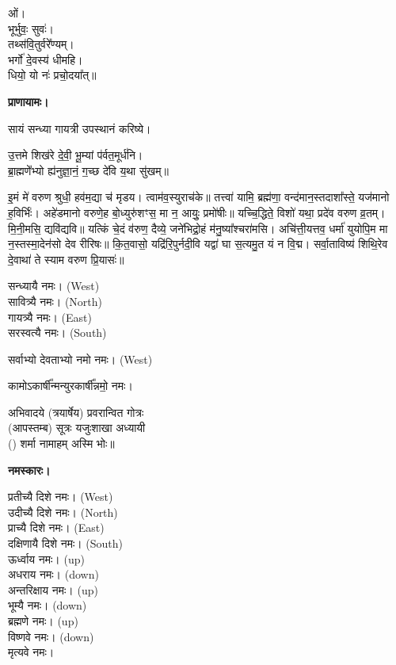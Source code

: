 ओं।\\
भूर्भुवः॒ सुवः॑।\\
तथ्स॑वि॒तुर्वरे᳚ण्यम्।\\
भर्गो॑ दे॒वस्य॑ धीमहि।\\
धियो॒ यो नः॑ प्रचो॒दया᳚त्॥

\textbf{प्राणायामः।}


सायं सन्ध्या गायत्री उपस्थानं करिष्ये।

उ॒त्तमे शिख॑रे दे॒वी॒ भू॒म्यां प॑र्वत॒मूर्ध॑नि।\\
ब्रा॒ह्मणे॑॑भ्यो ह्य॑नुज्ञा॒नं॒ ग॒च्छ दे॑वि य॒था सु॑खम्॥


इ॒मं मे॑ वरुण श्रुधी॒ हव॑म॒द्या च॑ मृडय। त्वाम॑व॒स्युराच॑के॥ तत्त्वा॑ यामि॒ ब्रह्म॑णा॒ वन्द॑मान॒स्तदाशा᳚स्ते॒ यज॑मानो ह॒विर्भिः॑। अहे॑डमानो वरुणे॒ह बो॒ध्युरु॑शꣳस॒ मा न॒ आयुः॒ प्रमो॑षीः॥
यच्चि॒द्धिते॒ विशो॑ यथा॒ प्रदे॑व वरुण व्र॒तम्। मि॒नी॒मसि॒ द्यवि॑द्यवि॥ यत्किं चे॒दं व॑रुण॒ दैव्ये॒ जने॑भिद्रो॒हं म॑नु॒ष्या᳚श्चरा॑मसि। अचि॑त्ती॒यत्तव॒ धर्मा॑ युयोपि॒म मा न॒स्तस्मा॒देन॑सो देव रीरिषः॥ कि॒त॒वासो॒ यद्रि॑रि॒पुर्नदी॒वि यद्वा॑ घा स॒त्यमु॒त यं न वि॒द्म। सर्वा॒ताविष्य॑ शिथि॒रेव दे॒वाथा॑ ते स्याम वरुण प्रि॒यासः॑॥


सन्ध्यायै नमः।  {\scriptsize (West)}\\
सावित्र्यै नमः। {\scriptsize (North)}\\
गायत्र्यै नमः।  {\scriptsize (East)}\\
सरस्वत्यै नमः।  {\scriptsize (South)}

सर्वाभ्यो देवताभ्यो नमो नमः। {\scriptsize (West)}

कामोऽकार्\mbox{}षी᳚न्मन्युरकार्\mbox{}षी᳚न्नमो॒ नमः।

अभिवादये \blank{} (त्रयार्षेय) प्रवरान्वित \blank{} गोत्रः\\
(आपस्तम्ब) सूत्रः यजुःशाखा अध्यायी\\
() शर्मा नामाहम् अस्मि भोः॥

\textbf{नमस्कारः।}


प्रतीच्यै दिशे नमः।   {\scriptsize (West)}\\
उदीच्यै दिशे नमः।   {\scriptsize (North)}\\
प्राच्यै दिशे नमः।   {\scriptsize (East)}\\
दक्षिणायै दिशे नमः।  {\scriptsize (South)}\\
ऊर्ध्वाय नमः।   {\scriptsize (up)}\\
अधराय नमः।   {\scriptsize (down)}\\
अन्तरिक्षाय नमः। {\scriptsize (up)}\\
भूम्यै नमः। {\scriptsize (down)}\\
ब्रह्मणे नमः। {\scriptsize (up)}\\
विष्णवे नमः।  {\scriptsize (down)}\\
मृत्यवे नमः।

